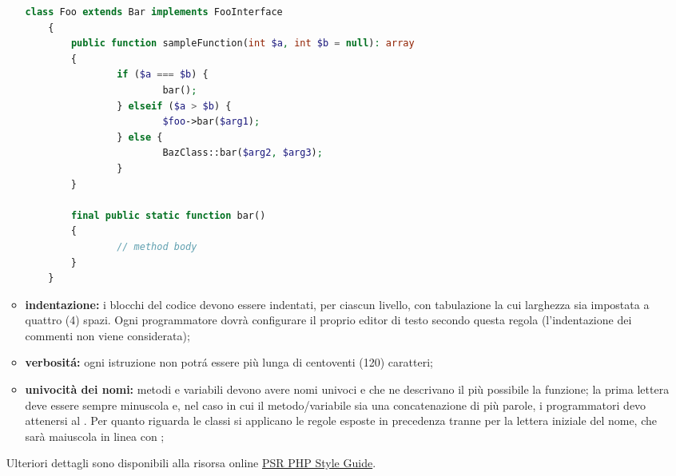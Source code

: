 \begin{itemize}
\begin{itemize}
\begin{lstlisting}[language=php,captionpos=b,caption={Esempio per la sintassi PHP}]
	class Foo extends Bar implements FooInterface
	{
		public function sampleFunction(int $a, int $b = null): array
		{
				if ($a === $b) {
						bar();
				} elseif ($a > $b) {
						$foo->bar($arg1);
				} else {
						BazClass::bar($arg2, $arg3);
				}
		}

		final public static function bar()
		{
				// method body
		}
	}
								\end{lstlisting}
								\item \textbf{indentazione:} i blocchi del codice devono essere indentati, per ciascun livello, con tabulazione la cui larghezza sia impostata a quattro (4) spazi. Ogni programmatore dovrà configurare il proprio editor di testo secondo questa regola (l'indentazione dei commenti non viene considerata);
								\item \textbf{verbositá:} ogni istruzione non potrá essere più lunga di centoventi (120) caratteri;
								\item \textbf{univocità dei nomi:} metodi e variabili devono avere nomi univoci e che ne descrivano il più possibile la funzione; la prima lettera deve essere sempre minuscola e, nel caso in cui il metodo/variabile sia una concatenazione di più parole, i programmatori devo attenersi al .
								Per quanto riguarda le classi si applicano le regole esposte in precedenza tranne per la lettera iniziale del nome, che sarà maiuscola in linea con ;
							\end{itemize}
							Ulteriori dettagli sono disponibili alla risorsa online \href{https://www.php-fig.org/psr/psr-12}{PSR PHP Style Guide}.
					\end{itemize}
